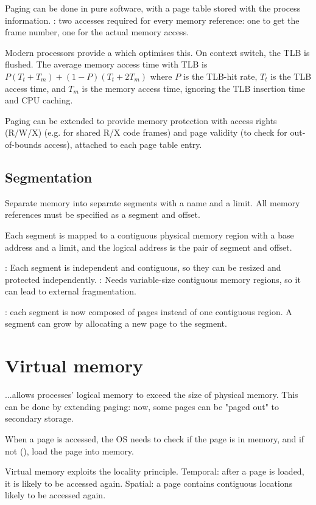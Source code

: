 \documentclass[fontsize=9pt,twoside]{slnotes}
\newcommand\benefits{\checkmark}
\newcommand\problems{\textsymbol{✗}}
\begin{document}
Paging can be done in pure software, with a page table stored with the process information. \problems: two accesses required for every memory reference: one to get the frame number, one for the actual memory access.

Modern processors provide a  which optimises this. On context switch, the TLB is flushed. The average memory access time with TLB is \(P (T_t + T_m) + (1 - P) (T_t + 2T_m)\) where \(P\) is the TLB-hit rate, \(T_t\) is the TLB access time, and \(T_m\) is the memory access time, ignoring the TLB insertion time and CPU caching.

Paging can be extended to provide memory protection with access rights (R/W/X) (e.g. for shared R/X code frames) and page validity (to check for out-of-bounds access), attached to each page table entry.

\subsection{Segmentation}
Separate memory into separate segments with a name and a limit. All memory references must be specified as a segment and offset.

Each segment is mapped to a contiguous physical memory region with a base address and a limit, and the logical address is the pair of segment and offset.

\benefits: Each segment is independent and contiguous, so they can be resized and protected independently. \problems: Needs variable-size contiguous memory regions, so it can lead to external fragmentation.

: each segment is now composed of pages instead of one contiguous region. A segment can grow by allocating a new page to the segment.

\section{Virtual memory}
...allows processes' logical memory to exceed the size of physical memory. This can be done by extending paging: now, some pages can be "paged out" to secondary storage.

When a page is accessed, the OS needs to check if the page is in memory, and if not (), load the page into memory.

Virtual memory exploits the locality principle. Temporal: after a page is loaded, it is likely to be accessed again. Spatial: a page contains contiguous locations likely to be accessed again.
\end{document}
